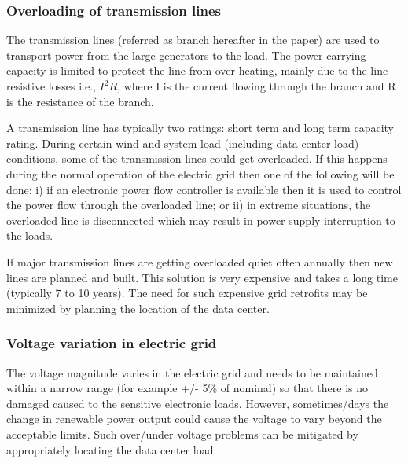 \subsubsection{Overloading of transmission lines}
The transmission lines (referred as branch hereafter in the paper) are used to transport power from the large generators to the load. The power carrying capacity is limited to protect the line from over heating, mainly due to the line resistive losses i.e., $I^{2}R$, where I is the current flowing through the branch and R is the resistance of the branch.

A transmission line has typically two ratings: short term and long term capacity rating. During certain wind and system load (including data center load) conditions, some of the transmission lines could get overloaded. If this happens during the normal operation of the electric grid then one of the following will be done: i) if an electronic power flow controller is available then it is used to control the power flow through the overloaded line; or ii) in extreme situations, the overloaded line is disconnected which may result in power supply interruption to the loads.

If major transmission lines are getting overloaded quiet often annually then new lines are planned and built. This solution is very expensive and takes a long time (typically 7 to 10 years). The need for such expensive grid retrofits may be minimized by planning the location of the data center.

\subsubsection{Voltage variation in electric grid}
The voltage magnitude varies in the electric grid and needs to be maintained within a narrow range (for example +/- 5\% of nominal) so that there is no damaged caused to the sensitive electronic loads. However, sometimes/days the change in renewable power output could cause the voltage to vary beyond the acceptable limits. Such over/under voltage problems can be mitigated by appropriately locating the data center load.

